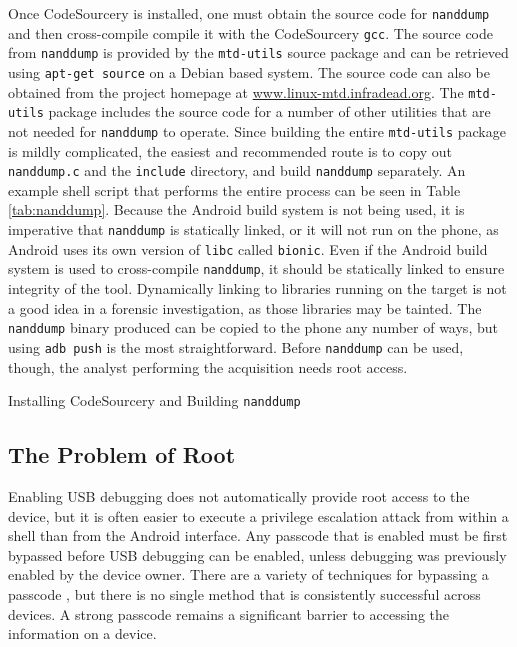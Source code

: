 Once CodeSourcery is installed, one must obtain the source code for \texttt{nanddump} and then cross-compile compile it with the CodeSourcery
\texttt{gcc}.  The source code from \texttt{nanddump} is provided by the \texttt{mtd-utils} source package and can be retrieved
using \texttt{apt-get source} on a Debian based system.  The source code can also be obtained from the project homepage at
\url{www.linux-mtd.infradead.org}.  The \texttt{mtd-utils} package includes the source code for a number of other utilities that
are not needed for \texttt{nanddump} to operate.  Since building the entire \texttt{mtd-utils} package is mildly complicated, the
easiest and recommended route is to copy out \texttt{nanddump.c} and the \texttt{include} directory, and build \texttt{nanddump}
separately.  An example shell script that performs the entire process can be seen in Table \ref{tab:nanddump}.  Because the Android
build system is not being used, it is imperative that \texttt{nanddump} is statically linked, or it will not run on the phone, as
Android uses its own version of \texttt{libc} called \texttt{bionic}.  Even if the Android build system is used to cross-compile
\texttt{nanddump}, it should be statically linked to ensure integrity of the tool.  Dynamically linking to libraries running on the
target is not a good idea in a forensic investigation, as those libraries may be tainted.  The \texttt{nanddump} binary produced can
be copied to the phone any number of ways, but using \texttt{adb push} is the most straightforward.  Before \texttt{nanddump} can be
used, though, the analyst performing the acquisition needs root access.

\begin{table}[htb]

\caption{Installing CodeSourcery and Building \texttt{nanddump}}
\label{tab:nanddump}
\end{table}

\subsection{The Problem of Root}
Enabling USB debugging does not automatically provide root access to the device, but it is
often easier to execute a privilege escalation attack from within a shell than from the Android interface. Any passcode that is
enabled must be first bypassed before USB debugging can be enabled, unless debugging was previously enabled by the device owner.
There are a variety of techniques for bypassing a passcode \cite{hoog, lockscreenbypass0, lockscreenbypass1, lockscreenbypass2}, but
there is no single method that is consistently successful across devices.  A strong passcode remains a significant barrier to
accessing the information on a device.

